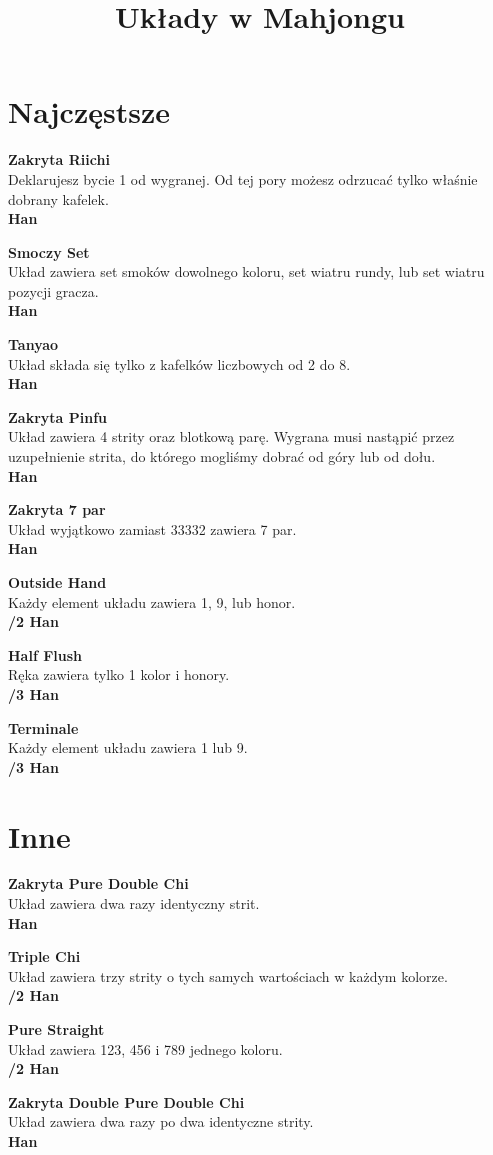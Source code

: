 \documentclass[12pt, a4paper]{article}
\title{Układy w Mahjongu}
\newcommand{\conc}[1]{\textbf{\color{BrickRed}Zakryta \color{Black} #1}\\}
\newcommand{\han}[1]{\\ \textbf{\color{BrickRed}\link{#1 }\color{Black}Han}}
\newcommand{\chan}[2]{\\ \textbf{\color{PineGreen}\link{#1}\color{Black}/\color{BrickRed}#2 \color{Black}Han}}
\begin{document}
    \section*{Najczęstsze}
    \conc{Riichi}
    Deklarujesz bycie 1 od wygranej. Od tej pory możesz odrzucać tylko właśnie dobrany kafelek. \han{1}

    \vspace*{1cm}

    \textbf{Smoczy Set\\}
    Układ zawiera set smoków dowolnego koloru, set wiatru rundy, lub set wiatru pozycji gracza. \han{1}

    \textbf{Tanyao\\}
    Układ składa się tylko z kafelków liczbowych od 2 do 8. \han{1}

    \conc{Pinfu}
    Układ zawiera 4 strity oraz blotkową parę. Wygrana musi nastąpić przez uzupełnienie 
    strita, do którego mogliśmy dobrać od góry lub od dołu. \han{1}

    \vspace*{1cm}

    \conc{7 par}
    Układ wyjątkowo zamiast 33332 zawiera 7 par. \han{2}

    \textbf{Outside Hand\\}
    Każdy element układu zawiera 1, 9, lub honor. \chan{1}{2}

    \textbf{Half Flush\\}
    Ręka zawiera tylko 1 kolor i honory. \chan{2}{3}

    \textbf{Terminale\\}
    Każdy element układu zawiera 1 lub 9. \chan{2}{3}


    \pagebreak
    \section*{Inne}

    \conc{Pure Double Chi}
    Układ zawiera dwa razy identyczny strit. \han{1}

    \textbf{Triple Chi \\}
    Układ zawiera trzy strity o tych samych wartościach w każdym kolorze. \chan{1}{2}

    \textbf{Pure Straight \\}
    Układ zawiera 123, 456 i 789 jednego koloru. \chan{1}{2}

    \conc{Double Pure Double Chi}
    Układ zawiera dwa razy po dwa identyczne strity. \han{3}
\end{document}
